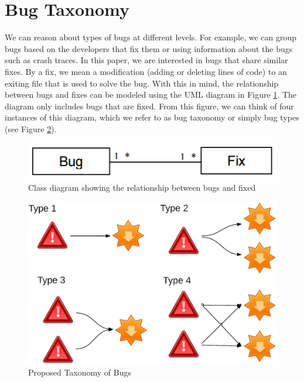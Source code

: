 
\section{Bug Taxonomy\label{sec:taxo}}

We can reason about types of bugs at different levels. For
example, we can group bugs based on the developers that fix
them or using information about the bugs such as crash traces.
In this paper, we are interested in bugs that share similar fixes.
By a fix, we mean a modification (adding or deleting lines of
code) to an exiting file that is used to solve the bug. With this
in mind, the relationship between bugs and fixes can be
modeled using the UML diagram in Figure \ref{fig:bug-taxo-diag}. The diagram
only includes bugs that are fixed. From this figure, we can
think of four instances of this diagram, which we refer to as
bug taxonomy or simply bug types (see Figure \ref{fig:bug-taxo}).

\begin{figure}[h!]
  \centering
    \includegraphics[scale=0.5]{media/bug-taxo-class-diag.png}
    \caption{Class diagram showing the relationship between bugs and fixed
    \label{fig:bug-taxo-diag}}
\end{figure}

\begin{figure}[h!]
  \centering
    \includegraphics[scale=0.8]{media/bug-taxo.png}
    \caption{Proposed Taxonomy of Bugs
    \label{fig:bug-taxo}}
\end{figure}


